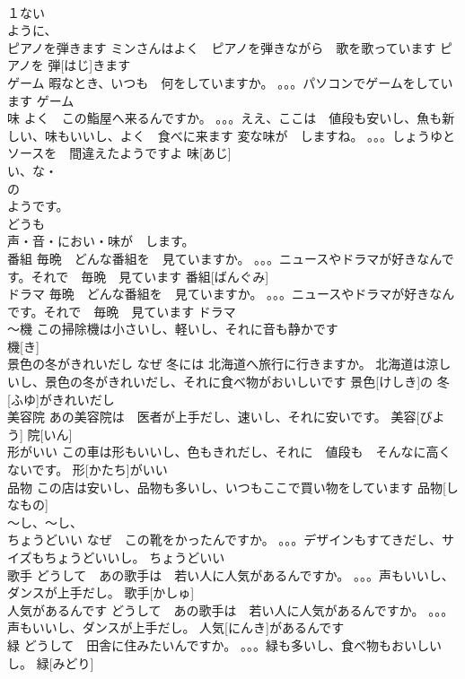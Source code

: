 \documentclass[8pt]{extreport}
\begin{document}
\begin{CJK}{UTF8}{min}
\\	１ない
\\	ように、
\\	ピアノを弾きます	ミンさんはよく　ピアノを弾きながら　歌を歌っています	ピアノを 弾[はじ]きます			
\\	ゲーム	暇なとき、いつも　何をしていますか。 。。。パソコンでゲームをしています	ゲーム					
\\	味	よく　この鮨屋へ来るんですか。 。。。ええ、ここは　値段も安いし、魚も新しい、味もいいし、よく　食べに来ます 変な味が　しますね。 。。。しょうゆとソースを　間違えたようですよ	味[あじ]				
\\	い、な・
\\	の
\\	ようです。
\\	どうも
\\	声・音・におい・味が　します。
\\	番組	毎晩　どんな番組を　見ていますか。 。。。ニュースやドラマが好きなんです。それで　毎晩　見ています	番組[ばんぐみ]			
\\	ドラマ	毎晩　どんな番組を　見ていますか。 。。。ニュースやドラマが好きなんです。それで　毎晩　見ています	ドラマ			
\\	～機	この掃除機は小さいし、軽いし、それに音も静かです	
\\	機[き]					
\\	景色の冬がきれいだし	なぜ 冬には 北海道へ旅行に行きますか。 北海道は涼しいし、景色の冬がきれいだし、それに食べ物がおいしいです	景色[けしき]の 冬[ふゆ]がきれいだし					
\\	美容院	あの美容院は　医者が上手だし、速いし、それに安いです。	美容[びよう] 院[いん]					
\\	形がいい	この車は形もいいし、色もきれだし、それに　値段も　そんなに高くないです。	形[かたち]がいい					
\\	品物	この店は安いし、品物も多いし、いつもここで買い物をしています	品物[しなもの]			
\\	～し、～し、
\\	ちょうどいい	なぜ　この靴をかったんですか。 。。。デザインもすてきだし、サイズもちょうどいいし。	ちょうどいい						
\\	歌手	どうして　あの歌手は　若い人に人気があるんですか。 。。。声もいいし、ダンスが上手だし。	歌手[かしゅ]					
\\	人気があるんです	どうして　あの歌手は　若い人に人気があるんですか。 。。。声もいいし、ダンスが上手だし。	人気[にんき]があるんです					
\\	緑	どうして　田舎に住みたいんですか。 。。。緑も多いし、食べ物もおいしいし。	緑[みどり]					

\end{CJK}
\end{document}
